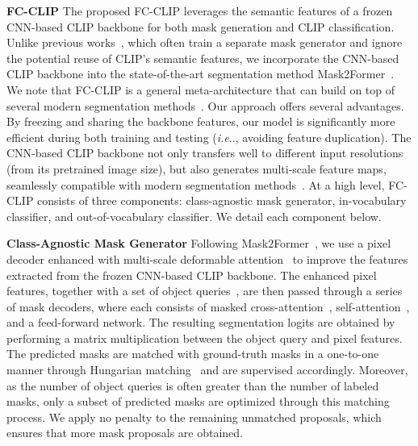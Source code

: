 \documentclass{article}
\makeatletter
\DeclareRobustCommand\onedot{\futurelet\@let@token\@onedot}
\def\@onedot{\ifx\@let@token.\else.\null\fi\xspace}
\def\ie{\emph{i.e}\onedot}
\newcommand{\modelname}{FC-CLIP\xspace}
\makeatother
\begin{document}
\noindent \textbf{\modelname}\quad
The proposed \modelname leverages the semantic features of a frozen CNN-based CLIP backbone for both mask generation and CLIP classification.
Unlike previous works~\cite{xu2021simple,liang2022open,ding2022open,xu2023open}, which often train a separate mask generator and ignore the potential reuse of CLIP's semantic features, we incorporate the CNN-based CLIP backbone into the state-of-the-art segmentation method Mask2Former~\cite{cheng2021masked}.
We note that \modelname is a general meta-architecture that can build on top of several modern segmentation methods~\cite{cheng2021masked,yu2022k}.
Our approach offers several advantages.
By freezing and sharing the backbone features, our model is significantly more efficient during both training and testing (\ie, avoiding feature duplication).
The CNN-based CLIP backbone not only transfers well to different input resolutions (from its pretrained image size), but also generates multi-scale feature maps, seamlessly compatible with modern segmentation methods~\cite{cheng2021masked,yu2022k}.
At a high level, \modelname consists of three components: class-agnostic mask generator, in-vocabulary classifier, and out-of-vocabulary classifier. We detail each component below.

\noindent \textbf{Class-Agnostic Mask Generator}\quad
Following Mask2Former~\cite{cheng2021masked}, we use a pixel decoder enhanced with multi-scale deformable attention~\cite{zhu2020deformable} to improve the features extracted from the frozen CNN-based CLIP backbone.
The enhanced pixel features, together with a set of object queries~\cite{carion2020end, wang2021max}, are then passed through a series of mask decoders, where each consists of masked cross-attention~\cite{cheng2021masked}, self-attention~\cite{vaswani2017attention}, and a feed-forward network.
The resulting segmentation logits are obtained by performing a matrix multiplication between the object query and pixel features.
The predicted masks are matched with ground-truth masks in a one-to-one manner through Hungarian matching~\cite{Kuhn1955NAVAL} and are supervised accordingly.
Moreover, as the number of object queries is often greater than the number of labeled masks, only a subset of predicted masks are optimized through this matching process. We apply no penalty to the remaining unmatched proposals, which ensures that more mask proposals are obtained.
\end{document}
